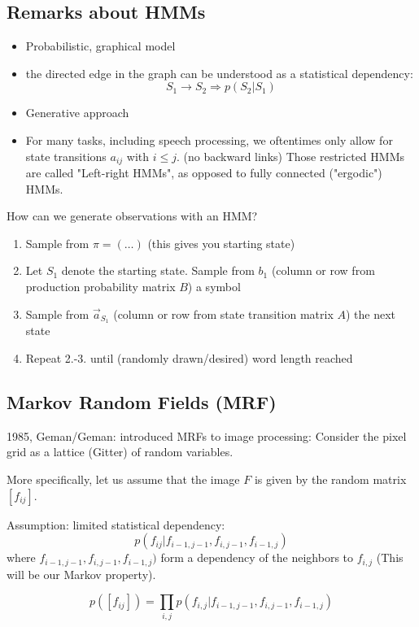 \documentclass{scrartcl}
\begin{document}
\subsection{Remarks about HMMs}
\begin{itemize}
    \item
        Probabilistic, graphical model
    \item
        the directed edge in the graph can be understood as a statistical dependency: \[S_1 \rightarrow S_2 \Rightarrow p(S_2|S_1)\]
    \item
        Generative approach
    \item
        For many tasks, including speech processing, we oftentimes only allow for state transitions \(a_{ij}\) with \(i \leq j\). (no backward links) Those restricted HMMs are called "Left-right HMMs", as opposed to fully connected ("ergodic") HMMs.
\end{itemize}

\medbreak
How can we generate observations with an HMM?
\begin{enumerate}
    \item
        Sample from \(\pi = (\dots)\) (this gives you starting state) 
    \item
        Let \(S_1\) denote the starting state. Sample from \(b_1\) (column or row from production probability matrix \(B\)) a symbol
    \item
        Sample from \(\vec{a}_{S_1}\) (column or row from state transition matrix \(A\)) the next state
    \item
        Repeat 2.-3. until (randomly drawn/desired) word length reached
\end{enumerate}

\subsection{Markov Random Fields (MRF)}
1985, Geman/Geman: introduced MRFs to image processing:  Consider the pixel grid as a lattice (Gitter) of random variables.

More specifically, let us assume that the image \(F\) is given by the random matrix \([f_{ij}]\). %

Assumption: limited statistical dependency:
\[p(f_{ij}| f_{i-1, j-1}, f_{i, j-1}, f_{i-1,j})\]
where \(f_{i-1, j-1}, f_{i, j-1}, f_{i-1,j})\) form a dependency of the neighbors to \(f_{i,j}\) (This will be our Markov property).

\[p([f_{ij}]) = \prod_{i,j} p(f_{i,j} | f_{i-1, j-1}, f_{i, j-1}, f_{i-1,j})\]
\end{document}
